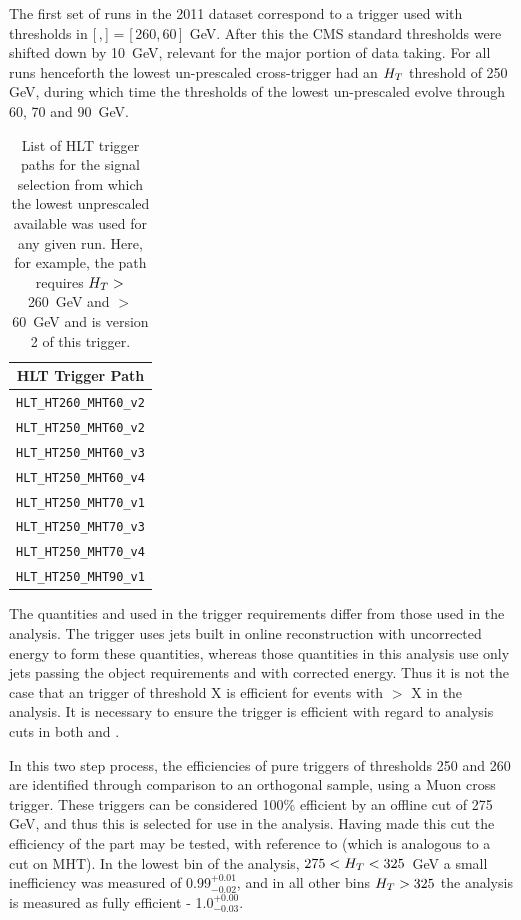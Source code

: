 The first set of runs in the 2011 dataset correspond to a trigger used with thresholds in [\,\HT,\,\MHT] = [\,260,\,60\,]~GeV. After this the CMS standard thresholds were shifted down by 10~GeV, relevant for the major portion of data taking. For all runs henceforth the lowest un-prescaled cross-trigger had an $H_{T}$ threshold of 250 GeV, during which time the \MHT thresholds of the lowest un-prescaled evolve through 60, 70 and 90~GeV.





\begin{table}[htbp]
\centering
\begin{tabular}{c}
\hline
\hline
HLT Trigger Path\\
\hline
\hline
\verb!HLT_HT260_MHT60_v2!\\
\verb!HLT_HT250_MHT60_v2!\\
\verb!HLT_HT250_MHT60_v3!\\
\verb!HLT_HT250_MHT60_v4!\\
\verb!HLT_HT250_MHT70_v1!\\
\verb!HLT_HT250_MHT70_v3!\\
\verb!HLT_HT250_MHT70_v4!\\
\verb!HLT_HT250_MHT90_v1!\\
\hline
\end{tabular}
\caption{\label{tab:sigtrig} List of HLT trigger paths for the signal selection from which the lowest unprescaled available was used for any given run. Here, for example, the path  requires $H_{T} >$ 260~GeV and \MHT $>$ 60~GeV and is version 2 of this trigger.}
\end{table}

The quantities \HT and \MHT used in the trigger requirements differ from those used in the analysis. The trigger uses jets built in online reconstruction with uncorrected energy to form these quantities, whereas those quantities in this analysis use only jets passing the object requirements and with corrected energy. Thus it is not the case that an \HT trigger of threshold X is efficient for events with \HT $>$ X in the analysis. It is necessary to ensure the trigger is efficient with regard to analysis cuts in both \HT and \MHT.

In this two step process, the efficiencies of pure \HT triggers of thresholds 250 and 260 are identified through comparison to an orthogonal sample, using a Muon \HT cross trigger. These triggers can be considered 100\% efficient by an offline \HT cut of 275 GeV, and thus this is selected for use in the analysis. Having made this cut the efficiency of the \MHT part may be tested, with reference to \alt (which is analogous to a cut on MHT). In the lowest bin of the analysis, $275 < H_{T} < 325$~GeV a small inefficiency was measured of 0.99$^{+0.01}_{-0.02}$, and in all other bins $H_{T} > 325$ the analysis is measured as fully efficient - 1.0$^{+0.00}_{-0.03}$.

